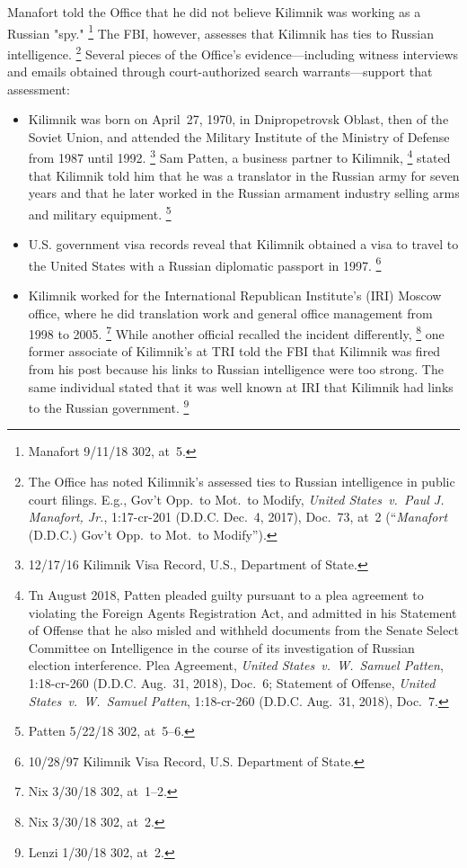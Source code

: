 Manafort told the Office that he did not believe Kilimnik was working as a Russian "spy."%
\footnote{Manafort 9/11/18 302, at~5.}
The FBI, however, assesses that Kilimnik has ties to Russian intelligence.%
\footnote{The Office has noted Kilimnik's assessed ties to Russian intelligence in public court filings.
E.g., Gov't Opp.\ to Mot.\ to Modify, \textit{United States~v.\ Paul J. Manafort, Jr.}, 1:17-cr-201 (D.D.C. Dec.~4, 2017), Doc.~73, at~2 (``\textit{Manafort} (D.D.C.) Gov't Opp.\ to Mot.\ to Modify'').}
Several pieces of the Office's evidence---including witness interviews and emails obtained through court-authorized search warrants---support that assessment:

\begin{itemize}

    \item Kilimnik was born on April~27, 1970, in Dnipropetrovsk Oblast, then of the Soviet Union, and attended the Military Institute of the Ministry of Defense from 1987 until 1992.%
\footnote{12/17/16 Kilimnik Visa Record, U.S., Department of State.}
    Sam Patten, a business partner to Kilimnik,%
\footnote{Tn August 2018, Patten pleaded guilty pursuant to a plea agreement to violating the Foreign Agents Registration Act, and admitted in his Statement of Offense that he also misled and withheld documents from the Senate Select Committee on Intelligence in the course of its investigation of Russian election interference.
Plea Agreement, \textit{United States~v.\ W.~Samuel Patten}, 1:18-cr-260 (D.D.C. Aug.~31, 2018), Doc.~6;
Statement of Offense, \textit{United States~v.\ W.~Samuel Patten}, 1:18-cr-260 (D.D.C. Aug.~31, 2018), Doc.~7.}
    stated that Kilimnik told him that he was a translator in the Russian army for seven years and that he later worked in the Russian armament industry selling arms and military equipment.%
\footnote{Patten 5/22/18 302, at~5--6.}

    \item U.S. government visa records reveal that Kilimnik obtained a visa to travel to the United States with a Russian diplomatic passport in 1997.%
\footnote{10/28/97 Kilimnik Visa Record, U.S. Department of State.}

    \item Kilimnik worked for the International Republican Institute's (IRI) Moscow office, where he did translation work and general office management from 1998 to 2005.%
\footnote{Nix 3/30/18 302, at~1--2.}
    While another official recalled the incident differently,%
\footnote{Nix 3/30/18 302, at~2.}
    one former associate of Kilimnik's at TRI told the FBI that Kilimnik was fired from his post because his links to Russian intelligence were too strong.
    The same individual stated that it was well known at IRI that Kilimnik had links to the Russian government.%
\footnote{Lenzi 1/30/18 302, at~2.}


\end{itemize}
